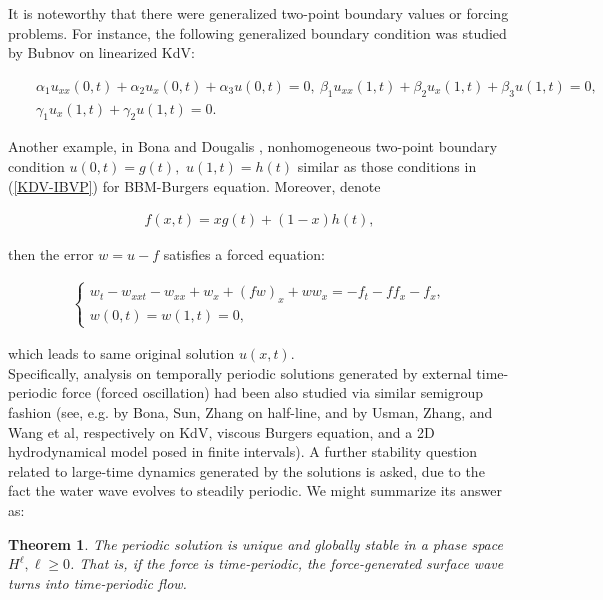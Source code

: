 \documentclass[10pt,a4paper,final]{article}
\numberwithin{equation}{section}
\newtheorem{theorem}{Theorem}[section]
\begin{document}
It is noteworthy that there were generalized two-point boundary values or forcing problems. For instance, the following generalized boundary condition was studied by Bubnov \cite{Bubnov} on linearized KdV: 

\begin{eqnarray*}
&&\alpha_1 u_{xx}(0,t) + \alpha_2 u_x(0,t) + \alpha_3 u(0,t) = 0,\ \beta_1 u_{xx}(1, t)+\beta_2 u_x(1, t) + \beta_3 u(1, t)=0,\\ &&\gamma_1 u_x(1, t) + \gamma_2 u(1, t) = 0.
\end{eqnarray*}

\noindent Another example, in Bona and Dougalis \cite{BD}, nonhomogeneous two-point boundary condition $u(0, t)=g(t),\,\,u(1, t)=h(t)$ similar as those conditions in (\ref{KDV-IBVP}) for BBM-Burgers equation. Moreover, denote

\begin{eqnarray*}
f(x, t) = xg(t)+(1-x)h(t),
\end{eqnarray*} 

then the error $w=u - f$ satisfies a forced equation:

\begin{eqnarray*}
\begin{cases}  
w_t-w_{xxt}-w_{xx}+w_x + (fw)_x+ww_x = -f_t-ff_x-f_x,\\
w(0,t)=w(1,t)=0,
\end{cases}
\end{eqnarray*}

which leads to same original solution $u(x,t)$.\\

Specifically, analysis on temporally periodic solutions generated by external time-periodic force (forced oscillation) had been also studied via similar semigroup fashion (see, e.g. \cite{BSZ2} by Bona, Sun, Zhang on half-line, and \cite{UsmanZ1, UsmanZ2, WZ, GWX} by Usman, Zhang, and Wang et al, respectively on KdV, viscous Burgers equation, and a 2D hydrodynamical model posed in finite intervals). A further stability question related to large-time dynamics generated by the solutions is asked, due to the fact the water wave evolves to steadily periodic. We might summarize its answer as: \\

\begin{theorem}\label{th1-1}
The periodic solution is unique and globally stable in a phase space $H^\ell, \ell\ge 0$. That is, if the force is time-periodic, the force-generated surface wave turns into time-periodic flow.
\end{theorem}
\end{document}
